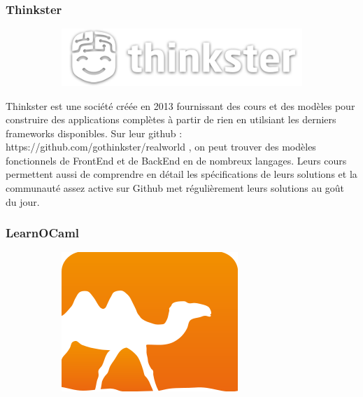 \documentclass{article}
\begin{document}
\subsubsection{Thinkster}
\begin{figure}[h!]
	\centering
  	\begin{subfigure}[b]{0.55\linewidth}
	\includegraphics[width=\linewidth]{thinkster.png}
  	\end{subfigure}
\end{figure}

Thinkster est une société créée en 2013 fournissant des cours et des modèles pour construire des applications complètes à partir de rien en utilsiant les derniers frameworks disponibles.
\newline
Sur leur github : https://github.com/gothinkster/realworld , on peut trouver des modèles fonctionnels de FrontEnd et de BackEnd en de nombreux langages. Leurs cours permettent aussi de comprendre en détail les spécifications de leurs solutions et la communauté assez active sur Github met régulièrement leurs solutions au goût du jour.


\subsubsection{LearnOCaml}

\begin{figure}[h!]
	\centering
  	\begin{subfigure}[b]{0.25\linewidth}
	\includegraphics[width=\linewidth]{lo.png}
  	\end{subfigure}
\end{figure}
\end{document}
